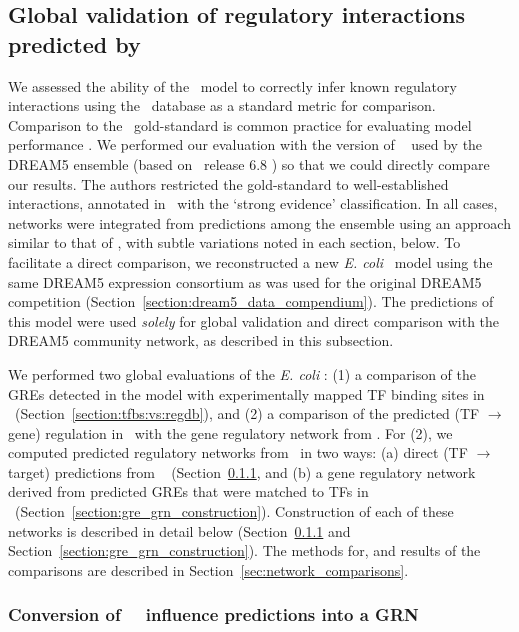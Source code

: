 \subsection{Global validation of regulatory interactions predicted by \egrine}
\label{section:aupr:vs:regdb}

We assessed the ability of the \egrine\ model to correctly infer known regulatory interactions using the \rdb\ database as a standard metric for comparison. Comparison to the \rdb\ gold-standard is common practice for evaluating model performance \cite{marbach_wisdom_2012}. We performed our evaluation with the version of \rdb~ used by the DREAM5 ensemble (based on \rdb\ release 6.8 \cite{marbach_wisdom_2012}) so that we could directly compare our results. The authors \cite{marbach_wisdom_2012} restricted the gold-standard to well-established interactions, annotated in \rdb\ with the `strong evidence' classification. In all cases, networks were integrated from predictions among the ensemble using an approach similar to that of \cite{marbach_wisdom_2012}, with subtle variations noted in each section, below. To facilitate a direct comparison, we reconstructed a new {\it E. coli} \egrine\ model using the same DREAM5 expression consortium as was used for the original DREAM5 competition (Section~\ref{section:dream5_data_compendium}). The predictions of this model were used {\it solely} for global validation and direct comparison with the DREAM5 community network, as described in this subsection.

We performed two global evaluations of the {\it E. coli} \egrine: (1) a comparison of the GREs detected in the model with experimentally mapped TF binding sites in \rdb~(Section~\ref{section:tfbs:vs:regdb}), and (2) a comparison of the predicted (TF $\rightarrow$ gene) regulation in \egrine~with the gene regulatory network from \cite{marbach_wisdom_2012}. For (2), we computed predicted regulatory networks from \egrine~in two ways: (a) direct (TF $\rightarrow$ target) predictions from \nwinf~ (Section~\ref{sec:nwinf_network}, and (b) a gene regulatory network derived from predicted GREs that were matched to TFs in \rdb~(Section~\ref{section:gre_grn_construction}). Construction of each of these networks is described in detail below (Section~\ref{sec:nwinf_network} and Section~\ref{section:gre_grn_construction}). The methods for, and results of the comparisons are described in Section~\ref{sec:network_comparisons}.

\subsubsection{Conversion of \egrine~\nwinf~influence predictions into a GRN}
\label{sec:nwinf_network}

